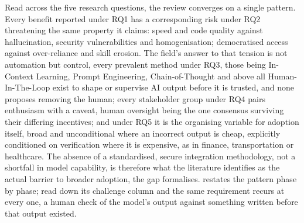 Read across the five research questions, the review converges on a single
pattern. Every benefit reported under RQ1 has a
corresponding risk under RQ2 threatening the same property it claims: speed
and code quality against hallucination, security vulnerabilities and
homogenisation; democratised access against over-reliance and skill erosion.
The field's answer to that tension is not automation but control, every
prevalent method under RQ3, those being In-Context Learning, Prompt Engineering,
Chain-of-Thought and above all Human-In-The-Loop exist to shape or
supervise AI output before it is trusted, and none proposes removing the
human; every stakeholder group under RQ4 pairs enthusiasm with a caveat,
human oversight being the one consensus surviving their differing
incentives; and under RQ5 it is the organising variable for adoption itself,
broad and unconditional where an incorrect output is cheap, explicitly
conditioned on verification where it is expensive, as in finance,
transportation or healthcare. The absence of a standardised, secure
integration methodology, not a shortfall in model capability, is therefore
what the literature identifies as the actual barrier to broader adoption,
the gap  formalises.  restates
the pattern phase by phase; read down its challenge column and the same
requirement recurs at every one, a human check of the model's output against
something written before that output existed.

